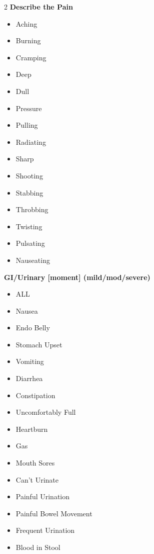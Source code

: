 \begin{multicols}{2}
  \textbf{Describe the Pain}
  \begin{itemize}
    \item Aching
    \item Burning
    \item Cramping
    \item Deep
    \item Dull
    \item Pressure
    \item Pulling
    \item Radiating
    \item Sharp
    \item Shooting
    \item Stabbing
    \item Throbbing
    \item Twisting
    \item Pulsating
    \item Nauseating
  \end{itemize}

  \textbf{GI/Urinary [moment] (mild/mod/severe)}
  \begin{itemize}
    \item ALL
    \item Nausea
    \item Endo Belly
    \item Stomach Upset
    \item Vomiting
    \item Diarrhea
    \item Constipation
    \item Uncomfortably Full
    \item Heartburn
    \item Gas
    \item Mouth Sores
    \item Can't Urinate
    \item Painful Urination
    \item Painful Bowel Movement
    \item Frequent Urination
    \item Blood in Stool
  \end{itemize}


\end{multicols}

